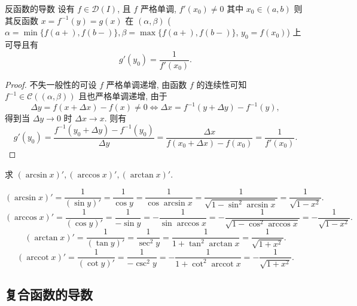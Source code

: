 \documentclass[cn,toc=twocol]{elegantbook}
\newcommand{\arccot}{\operatorname{arccot}}
\newcommand{\D}{\mathscr{D}}
\begin{document}
\begin{theorem}{反函数的导数}
	设有 $f \in \D(I)$, 且 $f$ 严格单调, $f'(x_0) \neq 0$ 其中 $x_0 \in (a,b)$ 则其反函数 $x = f^{-1}(y) = g(x)$ 在 $(\alpha,\beta)$ ($\alpha = \min\{f(a+),f(b-)\},\beta = \max\{f(a+),f(b-)\}$, $y_0 = f(x_0)$) 上可导且有
	\[
		g'(y_0) = \frac{1}{f'(x_0)}.
	\]
\end{theorem}

\begin{proof}
	不失一般性的可设 $f$ 严格单调递增, 由函数 $f$ 的连续性可知 $f^{-1} \in \mathscr{C}((\alpha,\beta))$ 且也严格单调递增, 由于
	\[
		\Delta y = f(x + \Delta x) - f(x) \neq 0 \Longleftrightarrow \Delta x = f^{-1}(y + \Delta y) - f^{-1}(y),
	\]
	得到当 $\Delta y \to 0$ 时 $\Delta x \to x$. 则有
	\[
		g'(y_0) = \frac{f^{-1}(y_0 + \Delta y) - f^{-1}(y_0)}{\Delta y} = \frac{\Delta x}{f(x_0 + \Delta x) - f(x_0)} = \frac{1}{f'(x_0)}.
	\]
\end{proof}
\vspace{1em}

\begin{example}
	求 $(\arcsin x)', (\arccos x)', (\arctan x)'$.
\end{example}
\begin{solution}
\[
	(\arcsin x)' = \frac{1}{(\sin y)'} = \frac{1}{\cos y} = \frac{1}{\cos \arcsin x} = \frac{1}{\sqrt{1 - \sin^2 \arcsin x}} = \frac{1}{\sqrt{1 - x^2}}.
\]
\[
	(\arccos x)' = \frac{1}{(\cos y)'} = \frac{1}{-\sin y} = -\frac{1}{\sin \arccos x} = -\frac{1}{\sqrt{1 - \cos^2 \arccos x}} = -\frac{1}{\sqrt{1 - x^2}}.
\]
\[
	(\arctan x)' = \frac{1}{(\tan y)'} = \frac{1}{\sec^2 y} = \frac{1}{1 + \tan^2 \arctan x}  = \frac{1}{\sqrt{1 + x^2}}.
\]
\[
	(\arccot x)' = \frac{1}{(\cot y)'} = \frac{1}{-\csc^2 y} =- \frac{1}{1 + \cot^2 \arccot x}  = -\frac{1}{\sqrt{1 + x^2}}.
\]
\end{solution}

\subsection{复合函数的导数}
\end{document}
